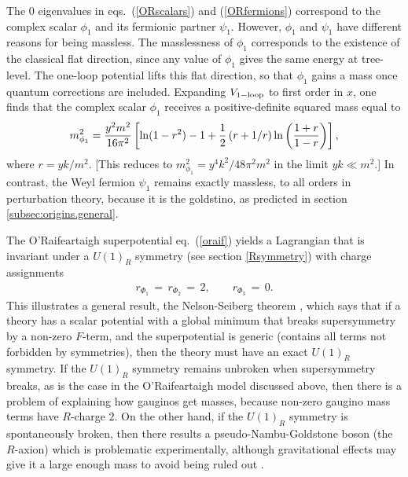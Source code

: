 \documentclass[12pt]{article}
\def\beq{\begin{eqnarray}}
\def\eeq{\end{eqnarray}}
\begin{document}
The 0 eigenvalues in eqs.~(\ref{ORscalars}) and
(\ref{ORfermions}) correspond to the complex scalar $\phi_1$ and its
fermionic partner $\psi_1$. However, $\phi_1$ and $\psi_1$ have different
reasons for being massless. The masslessness of $\phi_1$ corresponds to
the existence of the classical flat direction, since any value of $\phi_1$ gives the
same energy at tree-level. 
The one-loop potential 
lifts this flat direction, so that $\phi_1$ gains a 
mass once 
quantum corrections are included. Expanding $V_{\rm 1-loop}$ to first order in 
$x$, one finds that
the complex scalar $\phi_1$ receives a
positive-definite squared mass equal to
\beq
m_{\phi_1}^2 = {y^2 m^2\over 16 \pi^2} \left [
\ln (1 - r^2) - 1 + \frac{1}{2} \left ( r + 1/r \right )
\ln \left ( \frac{1 + r}{1-r} \right )
\right ],
\label{eq:ORmsq}
\eeq
where $r = y k/m^2$. [This reduces to $m_{\phi_1}^2 =
y^4 k^2/48 \pi^2 m^2$ in the limit $yk\ll m^2$.] 
In contrast, the Weyl
fermion $\psi_1$ remains exactly massless, to all orders in perturbation theory,
because it is the goldstino, as
predicted in section \ref{subsec:origins.general}.

The O'Rai\-f\-ear\-taigh superpotential eq.~(\ref{oraif}) yields a Lagrangian that 
is invariant under a
$U(1)_R$ symmetry (see section \ref{Rsymmetry}) with charge assignments
\beq
r_{\Phi_1} \,=\, r_{\Phi_2} \,=\, 2,\qquad
r_{\Phi_3} \,=\, 0.
\eeq
This illustrates a general result, the Nelson-Seiberg theorem \cite{Nelson:1993nf}, 
which says that
if a theory has a scalar potential with a global minimum that breaks supersymmetry by a non-zero 
$F$-term, and the superpotential is generic 
(contains all terms not forbidden by symmetries), 
then the theory must have an exact $U(1)_R$
symmetry. If the $U(1)_R$ symmetry remains unbroken when supersymmetry breaks, 
as is the case in the O'Rai\-f\-ear\-taigh model discussed above, then 
there is a 
problem of explaining how gauginos get masses, because non-zero gaugino mass
terms have $R$-charge 
$2$. On the other hand, if the $U(1)_R$ symmetry is spontaneously broken,
then there results a pseudo-Nambu-Goldstone boson (the $R$-axion) which is problematic
experimentally, although gravitational effects may give it a large enough mass to avoid being 
ruled out \cite{Raxion}. 
\end{document}

